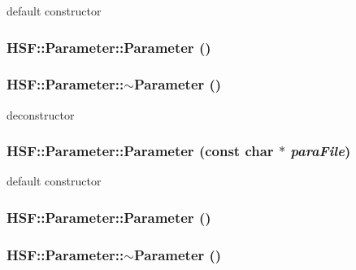 default constructor \hypertarget{classHSF_1_1Parameter_a6c1b209f15999e6ddf19d756adbdbae8}{
\subsubsection[{Parameter}]{\setlength{\rightskip}{0pt plus 5cm}HSF::Parameter::Parameter ()}}
\label{classHSF_1_1Parameter_a6c1b209f15999e6ddf19d756adbdbae8}
\hypertarget{classHSF_1_1Parameter_ac59ca61eccd3d1e8ad38133c06ea8178}{
\subsubsection[{$\sim$Parameter}]{\setlength{\rightskip}{0pt plus 5cm}HSF::Parameter::$\sim$Parameter ()}}
\label{classHSF_1_1Parameter_ac59ca61eccd3d1e8ad38133c06ea8178}


deconstructor \hypertarget{classHSF_1_1Parameter_a99364861f624da340a461c0226bcca63}{
\subsubsection[{Parameter}]{\setlength{\rightskip}{0pt plus 5cm}HSF::Parameter::Parameter (const char $\ast$ {\em paraFile})}}
\label{classHSF_1_1Parameter_a99364861f624da340a461c0226bcca63}


default constructor \hypertarget{classHSF_1_1Parameter_a6c1b209f15999e6ddf19d756adbdbae8}{
\subsubsection[{Parameter}]{\setlength{\rightskip}{0pt plus 5cm}HSF::Parameter::Parameter ()}}
\label{classHSF_1_1Parameter_a6c1b209f15999e6ddf19d756adbdbae8}
\hypertarget{classHSF_1_1Parameter_ac59ca61eccd3d1e8ad38133c06ea8178}{
\subsubsection[{$\sim$Parameter}]{\setlength{\rightskip}{0pt plus 5cm}HSF::Parameter::$\sim$Parameter ()}}
\label{classHSF_1_1Parameter_ac59ca61eccd3d1e8ad38133c06ea8178}


